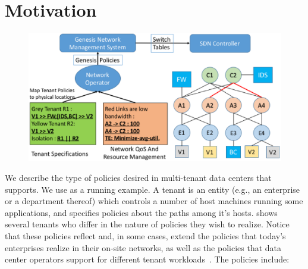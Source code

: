 \section{Motivation}
\begin{figure}
	\includegraphics[width=\columnwidth,center]{figures/architecture.eps}
	\label{fig:architecture}
\end{figure}



We describe the type of policies desired in multi-tenant data centers
that \Name supports.
We use  as a running example. A tenant is an
entity (e.g., an enterprise or a department thereof) which controls a
number of host machines running some applications, and specifies
policies about the paths among it's hosts.  shows several tenants
who differ in the nature of policies they wish to realize.  Notice
that these policies reflect and, in some cases, extend the policies
that today's enterprises realize in their on-site networks, as well as
the policies that data center operators support for different
tenant workloads~\cite{mpa-imc15}.  The policies include:


